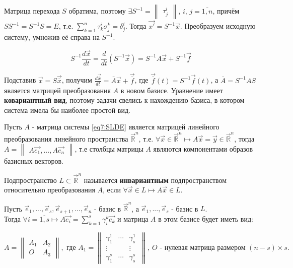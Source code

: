 Матрица перехода $S$ обратима, поэтому $\exists S^{-1} = \begin{Vmatrix} \tau_j^i \end{Vmatrix}$, $i,\,j = \overline{1, n}$, причём $SS^{-1} = S^{-1}S = E$, 
т.е. $\sum \limits_{k = 1}^n \tau_k^i \sigma_j^k = \delta_j^i$. Тогда $\vec{x'} = S^{-1}\vec{x}$.
Преобразуем исходную систему, умножив её справа на $S^{-1}$.

\[ S^{-1} \frac{d\vec{x}}{dt} = \frac{d}{dt} (S^{-1}\vec{x}) = S^{-1}A\vec{x} + S^{-1}\vec{f}\]

Подставив $\vec x = S \vec{\bar{x}}$, получим $\frac{d\vec{\bar{x}}}{dt} = \bar{A} \vec{x} + \vec{\bar{f}}$, где $\vec{\bar{f}}(t) = S^{-1}\vec{f}(t)$, 
а $\bar{A} = S^{-1}AS$ является матрицей преобразования $A$ в новом базисе. Уравнение имеет \textbf{ковариантный вид}, поэтому задачи свелись к нахождению базиса, в котором система имела бы наиболее простой вид.

Пусть $A$ - матрица системы \eqref{eq7:SLDE} является матрицей линейного преобразования линейного пространства $\vec{\mathbb{R}}^n$, 
т.е. $\forall \vec{x} \in \vec{\mathbb{R}}^n \mapsto A\vec{x} = \vec{y} \in \vec{\mathbb{R}}^n$, тогда $A = \begin{Vmatrix} A\vec{e_1}, ..., A\vec{e_n} \end{Vmatrix}$, 
т.е столбцы матрицы $A$ являются компонентами образов базисных векторов.


\begin{definition}
    Подпространство $L \subset \vec{\mathbb{R}}^n$ называется \textbf{инвариантным} подпространством относительно преобразования $A$, если $\forall \vec{x} \in L \mapsto A \vec{x} \in L$.
\end{definition}

Пусть $\vec{e}_1, ..., \vec{e}_s, \vec{e}_{s+1}, ..., \vec{e}_n$ - базис в $\vec{\mathbb{R}}^n$, а $\vec{e}_1, ..., \vec{e}_s$ - базис в $L$. \\
Тогда $\forall i = \overline{1, s} \mapsto A\vec{e_i} = \sum\limits_{k=1}^s \gamma_i^k \vec{e_k}$ и матрица $A$ в этом базисе будет иметь вид:

\[ A = \begin{Vmatrix} A_1 & A_2 \\ O & A_3 \end{Vmatrix}, \text{ где } A_1 = \begin{Vmatrix} \gamma_1^1 & \cdots & \gamma_s^1 \\ \vdots & & \vdots \\ \gamma_1^s &\cdots & \gamma_s^s\ \end{Vmatrix}, ~O \text{ - нулевая матрица размером } (n - s) \times s. \]

